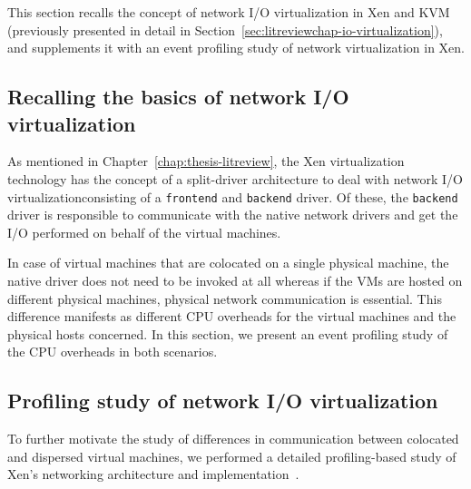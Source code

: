 This section recalls the concept of network I/O
virtualization in Xen and KVM 
(previously presented in detail in
Section~\ref{sec:litreviewchap-io-virtualization}), and supplements it
with an event profiling study of network virtualization in Xen.

\subsection{Recalling the basics of network I/O virtualization}
As mentioned in Chapter~\ref{chap:thesis-litreview}, the Xen
virtualization technology has the concept of a split-driver
architecture to deal with network I/O virtualization\textemdash{}consisting of
a \texttt{frontend} and \texttt{backend} driver. Of these, the 
\texttt{backend} driver is responsible to communicate with the 
native network drivers and get the I/O performed on behalf of the 
virtual machines. 

In case of virtual machines that are colocated on a single physical 
machine, the native driver does not need to be invoked at all whereas
if the VMs are hosted on different physical machines, physical network
communication is essential. This difference manifests as different
CPU overheads for the virtual machines and the physical hosts 
concerned. In this section, 
we present an event profiling study of the CPU overheads in both scenarios.

\subsection{Profiling study of network I/O virtualization}
To further motivate the study of differences in communication between
colocated and dispersed virtual machines, we performed a detailed 
profiling-based study of Xen's 
networking architecture and 
implementation~\cite{xen-internals, xen-networking, linux-networking}. 

